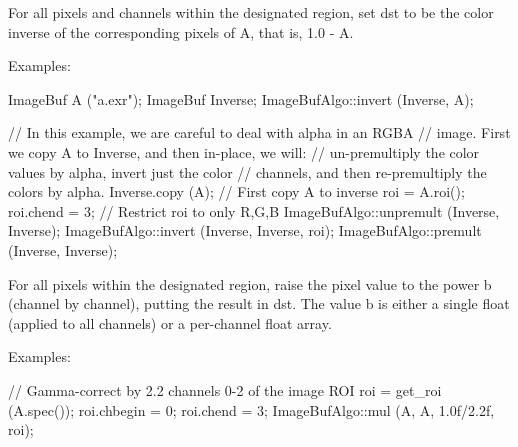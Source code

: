  

For all pixels and channels within the designated region, set {\cf dst}
to be the color inverse of the corresponding pixels of {\cf A}, that is,
1.0 - A.

\smallskip
\noindent Examples:
\begin{code}
    ImageBuf A ("a.exr");
    ImageBuf Inverse;
    ImageBufAlgo::invert (Inverse, A);

    // In this example, we are careful to deal with alpha in an RGBA
    // image. First we copy A to Inverse, and then in-place, we will:
    // un-premultiply the color values by alpha, invert just the color
    // channels, and then re-premultiply the colors by alpha.
    Inverse.copy (A);   // First copy A to inverse
    roi = A.roi();
    roi.chend = 3;      // Restrict roi to only R,G,B
    ImageBufAlgo::unpremult (Inverse, Inverse);
    ImageBufAlgo::invert (Inverse, Inverse, roi);
    ImageBufAlgo::premult (Inverse, Inverse);
\end{code}

\apiend


 

For all pixels within the designated region, raise the pixel value to the
power {\cf b} (channel by channel), putting the result in
{\cf dst}.  The value {\cf b} is either a single 
float (applied to all channels) or a per-channel float array.

\smallskip
\noindent Examples:
\begin{code}
    // Gamma-correct by 2.2 channels 0-2 of the image
    ROI roi = get_roi (A.spec());
    roi.chbegin = 0;  roi.chend = 3;
    ImageBufAlgo::mul (A, A, 1.0f/2.2f, roi);
\end{code}
\apiend


